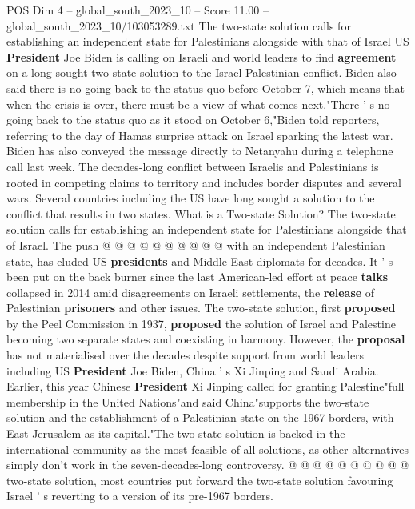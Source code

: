 \begin{textsample}{POS Dim 4 – global\_south\_2023\_10 – Score 11.00 – global\_south\_2023\_10/103053289.txt}  \label{ex:f4_pos_429}
The two-state solution calls for establishing an independent state for Palestinians alongside with that of Israel US \textbf{President} Joe Biden is calling on Israeli and world leaders to find \textbf{agreement} on a long-sought two-state solution to the Israel-Palestinian conflict.
Biden also said there is no going back to the status quo before October 7, which means that when the crisis is over, there must be a view of what comes next."There ' s no going back to the status quo as it stood on October 6,"Biden told reporters, referring to the day of Hamas surprise attack on Israel sparking the latest war.
Biden has also conveyed the message directly to Netanyahu during a telephone call last week.
The decades-long conflict between Israelis and Palestinians is rooted in competing claims to territory and includes border disputes and several wars.
Several countries including the US have long sought a solution to the conflict that results in two states.
What is a Two-state Solution?
The two-state solution calls for establishing an independent state for Palestinians alongside that of Israel.
The push @ @ @ @ @ @ @ @ @ @ with an independent Palestinian state, has eluded US \textbf{presidents} and Middle East diplomats for decades.
It ' s been put on the back burner since the last American-led effort at peace \textbf{talks} collapsed in 2014 amid disagreements on Israeli settlements, the \textbf{release} of Palestinian \textbf{prisoners} and other issues.
The two-state solution, first \textbf{proposed} by the Peel Commission in 1937, \textbf{proposed} the solution of Israel and Palestine becoming two separate states and coexisting in harmony.
However, the \textbf{proposal} has not materialised over the decades despite support from world leaders including US \textbf{President} Joe Biden, China ' s Xi Jinping and Saudi Arabia.
Earlier, this year Chinese \textbf{President} Xi Jinping called for granting Palestine"full membership in the United Nations"and said China"supports the two-state solution and the establishment of a Palestinian state on the 1967 borders, with East Jerusalem as its capital."The two-state solution is backed in the international community as the most feasible of all solutions, as other alternatives simply don't work in the seven-decades-long controversy. @ @ @ @ @ @ @ @ @ @ two-state solution, most countries put forward the two-state solution favouring Israel ' s reverting to a version of its pre-1967 borders.

\end{textsample}
